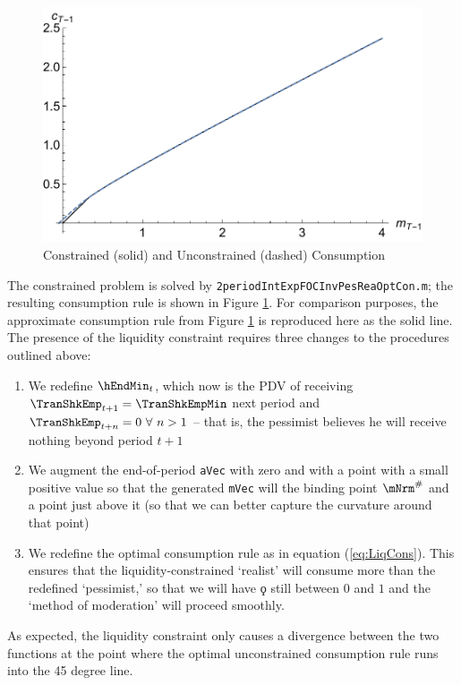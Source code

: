 \documentclass[titlepage, headings=optiontotocandhead]{\econtex}
\begin{document}
\hypertarget{cVScCon}{}
\begin{figure}
  \includegraphics{./Figures/cVScCon}
  \caption{Constrained (solid) and Unconstrained (dashed) Consumption}
  \label{fig:cVScCon}
\end{figure}

The constrained problem is solved by
\texttt{2periodIntExpFOCInvPesReaOptCon.m}; the resulting consumption
rule is shown in Figure \ref{fig:cVScCon}. For comparison purposes,
the approximate consumption rule from Figure \ref{fig:cVScCon} is
reproduced here as the solid line. The presence of the liquidity
constraint requires three changes to the procedures outlined above:
\begin{enumerate}
\item We redefine
  $\hEndMin_{t}$, which now is the PDV of receiving
  $\TranShkEmp_{t+1}=\TranShkEmpMin$ next period and
  $\TranShkEmp_{t+n}=0~\forall~n>1$ -- that is, the pessimist believes he
  will receive nothing beyond period $t+1$
\item We augment the end-of-period \texttt{aVec} with zero and with a point with a small positive value so that the generated 
  \texttt{mVec} will the binding point $\mNrm^{\#}$ and a point just above it (so that we can better capture the curvature
  around that point)
\item We redefine the optimal consumption rule as
  in equation (\ref{eq:LiqCons}).  This ensures that the
  liquidity-constrained `realist' will consume more than the redefined
  `pessimist,' so that we will have $\koppa$ still between $0$ and $1$
  and the `method of moderation' will proceed smoothly. 
\end{enumerate}

As expected, the
liquidity constraint only causes a divergence between the two
functions at the point where the optimal unconstrained consumption
rule runs into the 45 degree line.
\end{document}
